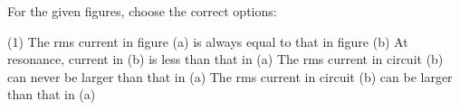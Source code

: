 \item For the given figures, choose the correct options:
    \begin{center}
    \end{center}
    \begin{tasks}(1)
        \task The rms current in figure (a) is always equal to that in figure (b)
        \task At resonance, current in (b) is less than that in (a)
        \task The rms current in circuit (b) can never be larger than that in (a)
        \task The rms current in circuit (b) can be larger than that in (a)
    \end{tasks}